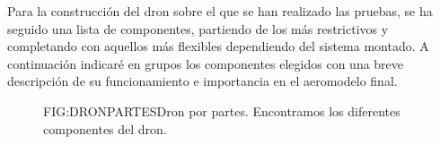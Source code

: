
Para la construcción del dron sobre el que se han realizado las pruebas, se ha seguido una lista de componentes, partiendo de los más restrictivos y completando con aquellos más flexibles dependiendo del sistema montado.
 A continuación indicaré en grupos los componentes elegidos con una breve descripción de su funcionamiento e importancia en el aeromodelo final.
 
\begin{figure}[Dron básico]{FIG:DRONPARTES}{Dron por partes. Encontramos los diferentes componentes del dron.}
\end{figure}
